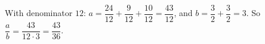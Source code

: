 With denominator $12$: $a=\dfrac{24}{12}+\dfrac{9}{12}+\dfrac{10}{12}=\dfrac{43}{12}$, and $b=\dfrac{3}{2}+\dfrac{3}{2}=3$. So $\dfrac {a}{b}=\dfrac{43}{12\cdot3}=\boxed{\dfrac{43}{36}}$.
